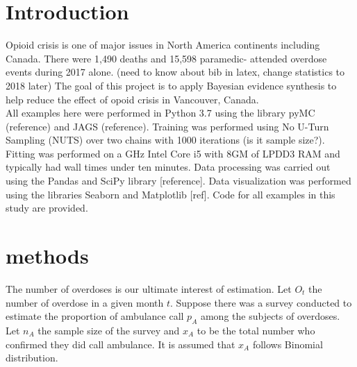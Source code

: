 \documentclass[
10pt, %
a4paper, %
oneside, %
headinclude,footinclude, %
BCOR5mm, %
]{scrartcl}
\begin{document}
\let\thefootnote\relax{}

\let\thefootnote\relax{}


\newpage %


\section{Introduction}
Opioid crisis is one of major issues in North America continents including Canada. There were 1,490 deaths and 15,598 paramedic- attended overdose events during 2017 alone. \cite{Irvine:modelling} (need to know about bib in latex, change statistics to 2018 later) The goal of this project is to apply Bayesian evidence synthesis to help reduce the effect of opoid crisis in Vancouver, Canada.  \\

All examples here were performed in Python 3.7 using the library pyMC (reference) and JAGS (reference). Training was performed using No U-Turn Sampling (NUTS) over two chains with 1000 iterations (is it sample size?). Fitting was performed on a GHz Intel Core i5 with 8GM of LPDD3 RAM and typically had wall times under ten minutes. Data processing was carried out using the Pandas and SciPy library [reference]. Data visualization was performed using the libraries Seaborn and Matplotlib [ref]. Code for all examples in this study are provided. 


\section{methods}

\normalsize
The number of overdoses is our ultimate interest of estimation. Let $O_t$ the number of overdose in a given month $t$. Suppose there was a survey  conducted to estimate the proportion of ambulance call $p_A$ among the subjects of overdoses. Let $n_{A}$ the sample size of the survey and   
$x_{A}$ to be the total number who confirmed they did call ambulance. It is assumed that $x_{A}$ follows Binomial distribution.
\end{document}
